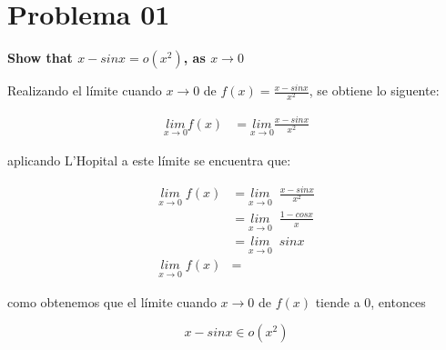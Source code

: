 \section*{Problema 01}

\textbf{Show that $x-sinx = o(x^2)$, as $x\rightarrow 0$}

Realizando el límite cuando $x\rightarrow 0$ de $f(x)=\frac{x-sinx}{x^2}$, se obtiene lo siguente:

\begin{align*}
	\underset{x\rightarrow 0}{lim} f(x) & = \underset{x\rightarrow 0}{lim} \frac{x-sinx}{x^2}
\end{align*}

aplicando L'Hopital a este límite se encuentra que:

\begin{align*}
	\underset{x\rightarrow 0}{lim} \;f(x) & = \underset{x\rightarrow 0}{lim} \;\;\frac{x-sinx}{x^2} \\
	                                      & = \underset{x\rightarrow 0}{lim} \;\;\frac{1-cosx}{x}   \\
	                                      & = \underset{x\rightarrow 0}{lim} \;\;sinx               \\
	\underset{x\rightarrow 0}{lim} \;f(x) & =
\end{align*}


como obtenemos que el límite cuando $x\rightarrow 0$ de $f(x)$ tiende a 0, entonces

\begin{equation*}
	x-sinx \in o(x^2)
\end{equation*}
